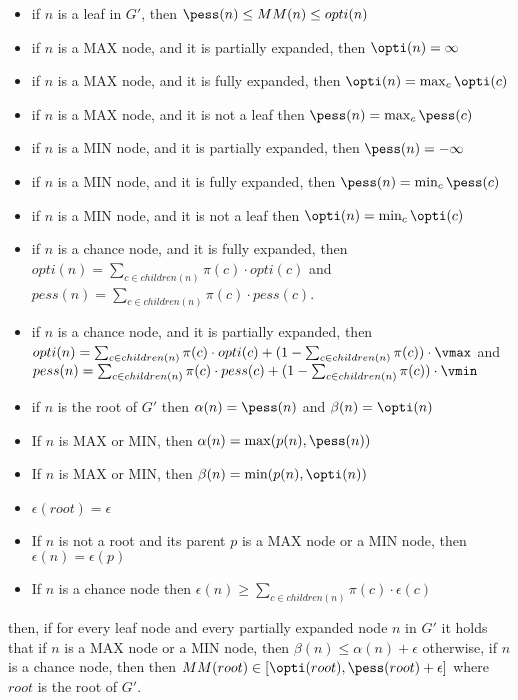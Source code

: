 \begin{itemize}
\item if $n$ is a leaf in $G'$, then $\pess(n)\leq MM(n)\leq opti(n)$
\item if $n$ is a MAX node, and it is partially expanded, then $\opti(n)=\infty$
\item if $n$ is a MAX node, and it is fully expanded, then $\opti(n)=\max_c \opti(c)$
\item if $n$ is a MAX node, and it is not a leaf then $\pess(n)=\max_c \pess(c)$
\item if $n$ is a MIN node, and it is partially expanded, then $\pess(n)=-\infty$
\item if $n$ is a MIN node, and it is fully expanded, then $\pess(n)=\min_c \pess(c)$
\item if $n$ is a MIN node, and it is not a leaf then $\opti(n)=\min_c \opti(c)$
\item if $n$ is a chance node, and it is fully expanded, then 
$opti(n)=\sum_{c\in children(n)}\pi(c)\cdot opti(c)$ 
and $pess(n)=\sum_{c\in children(n)}\pi(c)\cdot pess(c)$.
\item if $n$ is a chance node, and it is partially expanded, then 
$opti(n)=\sum_{c\in children(n)}\pi(c)\cdot opti(c)
+(1-\sum_{c\in children(n)}\pi(c))\cdot \vmax$
and 
$pess(n)=\sum_{c\in children(n)}\pi(c)\cdot pess(c)
+(1-\sum_{c\in children(n)}\pi(c))\cdot \vmin$
\item if $n$ is the root of $G'$ then $\alpha(n)=\pess(n)$ and $\beta(n)=\opti(n)$ 

\item If $n$ is MAX or MIN, then $\alpha(n)=\max(p(n),\pess(n))$ 
\item If $n$ is MAX or MIN, then $\beta(n)=\min(p(n),\opti(n))$
\item $\epsilon(root)=\epsilon$
\item If $n$ is not a root and its parent $p$ is a MAX node or a MIN node, then $\epsilon(n)=\epsilon(p)$
\item If $n$ is a chance node then $\epsilon(n)\geq \sum_{c\in children(n)}\pi(c)\cdot \epsilon(c)$
\end{itemize}
then, if for every leaf node and every partially expanded node $n$ in $G'$ it holds that 
if $n$ is a MAX node or a MIN node, then 
$\beta(n)\leq \alpha(n)+\epsilon$ 
otherwise, if $n$ is a chance node, then 
then 
$MM(root)\in [\opti(root),\pess(root)+\epsilon]$
where $root$ is the root of $G'$. 



